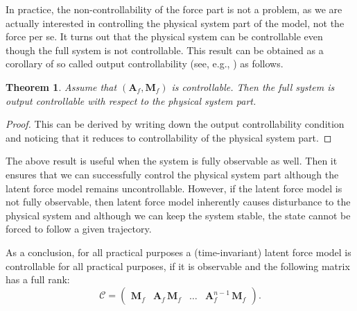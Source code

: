 \documentclass[journal]{IEEEtran}
\newtheorem{theorem}{Theorem}[section]
\begin{document}
In practice, the non-controllability of the force part is not a problem, as we are actually interested in controlling the physical system part of the model, not the force per se. It turns out that the physical system can be controllable even though the full system is not controllable. This result can be obtained as a corollary of so called output controllability (see, e.g., \cite{Ogata:1997}) as follows.

\begin{theorem} \label{the:stab}
Assume that $(\mathbf{A}_f,\mathbf{M}_f)$ is controllable. Then the full system is output controllable with respect to the physical system part.
\end{theorem}

\begin{proof}
This can be derived by writing down the output controllability condition \cite{Ogata:1997} and noticing that it reduces to controllability of the physical system part.
\end{proof}

The above result is useful when the system is fully observable as well. Then it ensures that we can successfully control the physical system part although the latent force model remains uncontrollable. However, if the latent force model is not fully observable, then latent force model inherently causes disturbance to the physical system and although we can keep the system stable, the state cannot be forced to follow a given trajectory.

As a conclusion, for all practical purposes a (time-invariant) latent force model is controllable for all practical purposes, if it is observable and the following matrix has a full rank:
%
\begin{equation}
  \mathcal{C} = \begin{pmatrix}
  	\mathbf{M}_f & \mathbf{A}_f \, \mathbf{M}_f & \hdots & \mathbf{A}_f^{n-1} \, \mathbf{M}_f
  \end{pmatrix}.
\end{equation}
\end{document}

